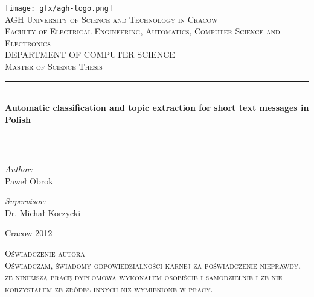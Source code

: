 \documentclass[11pt,a4paper]{article}
\newcommand{\HRule}{\rule{\linewidth}{0.5mm}}
\begin{document}
\begin{titlepage}

\begin{center}
\texttt{[image: gfx/agh-logo.png]}\\[1cm]

\textsc{\LARGE AGH University of Science and Technology in Cracow}\\[0.5cm]
\textsc{\Large Faculty of Electrical Engineering, Automatics, Computer Science and Electronics}\\[0.5cm]
\textsc{\Large DEPARTMENT OF COMPUTER SCIENCE}\\[1.5cm]
\textsc{\Large Master of Science Thesis}\\[0.5cm]

\HRule \\[0.4cm]
{ \Large \bfseries Automatic classification and topic extraction for short text messages in Polish}\\[0.4cm]

\HRule \\[1.5cm]
\begin{minipage}{0.4\textwidth}
\begin{flushleft} \large
\emph{Author:}\\
Paweł Obrok
\end{flushleft}
\end{minipage}
\begin{minipage}{0.4\textwidth}
\begin{flushright} \large
\emph{Supervisor:} \\
Dr. Michał Korzycki
\end{flushright}
\end{minipage}

\vfill

{\large Cracow 2012}
\end{center}

\end{titlepage}

\begin{center}
\vfill

\textsc{\Large Oświadczenie autora}\\[0.5cm]
\textsc{Oświadczam, świadomy odpowiedzialności karnej za poświadczenie nieprawdy, że niniejszą pracę dyplomową wykonałem osobiście i samodzielnie i że nie korzystałem ze źródeł innych niż wymienione w pracy.}\\[0.5cm]
\end{center}
\pagebreak

\tableofcontents
\pagebreak
\end{document}
